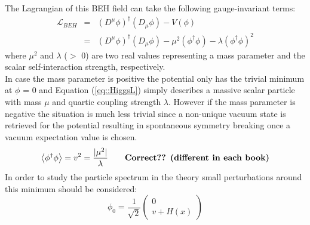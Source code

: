 The Lagrangian of this BEH field can take the following gauge-invariant terms:
\begin{eqnarray} \label{eq::HiggsL}
 \mathcal{L}_{BEH} & = & (D^{\mu} \phi)^{\dagger}(D_{\mu} \phi) - V(\phi) \nonumber \\
                   & = & (D^{\mu} \phi)^{\dagger}(D_{\mu} \phi) - \mu^{2} (\phi^{\dagger} \phi) - \lambda (\phi^{\dagger} \phi)^{2}
\end{eqnarray}
where $\mu^{2}$ and $\lambda$ ($>$ 0) are two real values representing a mass parameter and the scalar self-interaction strength, respectively.
\\
In case the mass parameter is positive the potential only has the trivial minimum at $\phi$ = 0 and Equation (\ref{eq::HiggsL}) simply describes a massive scalar particle with mass $\mu$ and quartic coupling strength $\lambda$. However if the mass parameter is negative the situation is much less trivial since a non-unique vacuum state is retrieved for the potential resulting in spontaneous symmetry breaking once a vacuum expectation value is chosen.
\begin{equation}
 \left< \phi^{\dagger} \phi \right> = v^{2} = \frac{\vert \mu^{2} \vert}{\lambda} \qquad \textrm{\textbf{Correct?? (different in each book)}}
\end{equation}
In order to study the particle spectrum in the theory small perturbations around this minimum should be considered:
\begin{equation}
 \phi_{0} = \frac{1}{\sqrt{2}}\begin{pmatrix}
             0 \\
             v + H(x)
            \end{pmatrix}
\end{equation}

